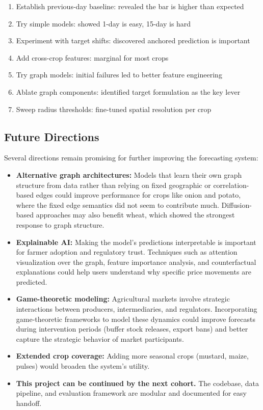 \documentclass[12pt]{article}
\begin{document}
\begin{enumerate}
\item Establish previous-day baseline: revealed the bar is higher than expected
\item Try simple models: showed 1-day is easy, 15-day is hard
\item Experiment with target shifts: discovered anchored prediction is important
\item Add cross-crop features: marginal for most crops
\item Try graph models: initial failures led to better feature engineering
\item Ablate graph components: identified target formulation as the key lever
\item Sweep radius thresholds: fine-tuned spatial resolution per crop
\end{enumerate}

\subsection{Future Directions}

Several directions remain promising for further improving the forecasting system:

\begin{itemize}
\item \textbf{Alternative graph architectures:} Models that learn their own graph structure from data rather than relying on fixed geographic or correlation-based edges could improve performance for crops like onion and potato, where the fixed edge semantics did not seem to contribute much. Diffusion-based approaches may also benefit wheat, which showed the strongest response to graph structure.
\item \textbf{Explainable AI:} Making the model's predictions interpretable is important for farmer adoption and regulatory trust. Techniques such as attention visualization over the graph, feature importance analysis, and counterfactual explanations could help users understand why specific price movements are predicted.
\item \textbf{Game-theoretic modeling:} Agricultural markets involve strategic interactions between producers, intermediaries, and regulators. Incorporating game-theoretic frameworks to model these dynamics could improve forecasts during intervention periods (buffer stock releases, export bans) and better capture the strategic behavior of market participants.
\item \textbf{Extended crop coverage:} Adding more seasonal crops (mustard, maize, pulses) would broaden the system's utility.
\item \textbf{This project can be continued by the next cohort.} The codebase, data pipeline, and evaluation framework are modular and documented for easy handoff.
\end{itemize}
\end{document}
